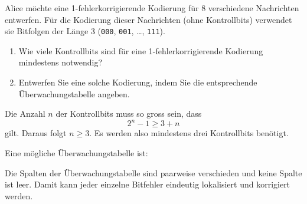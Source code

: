 \begin{myexercise}
	Alice möchte eine 1-fehlerkorrigierende Kodierung für
	8 verschiedene Nachrichten entwerfen. Für die Kodierung
	dieser Nachrichten (ohne Kontrollbits) verwendet sie
	Bitfolgen der Länge 3
	(\texttt{000}, \texttt{001}, \ldots, \texttt{111}).

	\begin{enumerate}
		\item Wie viele Kontrollbits sind für eine
		      1-fehlerkorrigierende Kodierung mindestens notwendig?

		\item Entwerfen Sie eine solche Kodierung, indem Sie
		      die entsprechende Überwachungstabelle angeben.
	\end{enumerate}
	\begin{myanswer}

		Die Anzahl \(n\) der Kontrollbits muss so gross sein, dass
		\[
			2^n-1 \geq 3+n
		\]
		gilt. Daraus folgt \(n\geq 3\). Es werden also mindestens
		drei Kontrollbits benötigt.

		Eine mögliche Überwachungstabelle ist:

		\begin{center}
		\end{center}

		Die Spalten der Überwachungstabelle sind paarweise verschieden
		und keine Spalte ist leer. Damit kann jeder einzelne Bitfehler
		eindeutig lokalisiert und korrigiert werden.

	\end{myanswer}
\end{myexercise}


